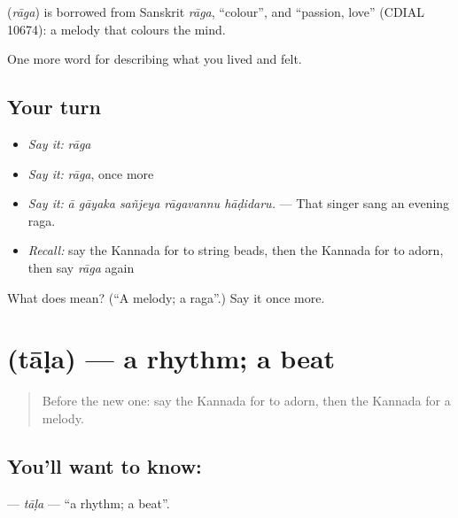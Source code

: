 \begin{cousinweb}
\textbf{} (\emph{rāga}) is borrowed from Sanskrit \emph{rāga}, \textquotedblleft{}colour\textquotedblright{}, and \textquotedblleft{}passion, love\textquotedblright{} (CDIAL 10674): a melody that colours the mind.
\end{cousinweb}

\begin{grammarlens}[title={What you've built}]
One more word for describing what you lived and felt.
\end{grammarlens}

\subsection*{Your turn}
\begin{itemize}
\raggedright
  \item \emph{Say it:} \emph{rāga}
  \item \emph{Say it:} \emph{rāga}, once more
  \item \emph{Say it:} \emph{ā gāyaka sañjeya rāgavannu hāḍidaru.} — That singer sang an evening raga.
  \item \emph{Recall:} say the Kannada for to string beads, then the Kannada for to adorn, then say \emph{rāga} again
\end{itemize}

\begin{tcolorbox}[breakable,colback=teal!4,colframe=teal!35!black,title={Before you move on}]
What does  mean? (\textquotedblleft{}A melody; a raga\textquotedblright{}.) Say it once more.
\end{tcolorbox}
\section[\texorpdfstring{\kn{ತಾಳ} (tāḷa)}{ತಾಳ (tāḷa)}]{ (tāḷa) — a rhythm; a beat}

\label{lesson:KA-C534-tala}



\begin{quote}
Before the new one: say the Kannada for to adorn, then the Kannada for a melody.
\end{quote}

\subsection*{You'll want to know: }
\textbf{} — \emph{tāḷa} — \textquotedblleft{}a rhythm; a beat\textquotedblright{}.

